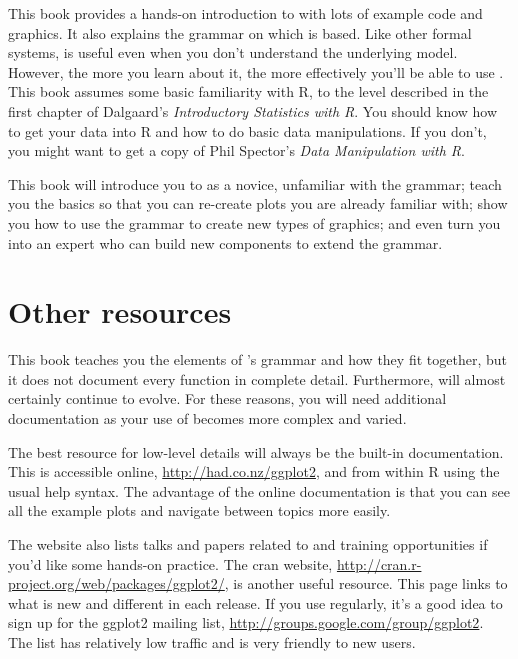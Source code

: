 This book provides a hands-on introduction to \ggplot with lots of example code and graphics. It also explains the grammar on which \ggplot is based. Like other formal systems, \ggplot is useful even when you don't understand the underlying model. However, the more you learn about it, the more effectively you'll be able to use \ggplot.  This book assumes some basic familiarity with R, to the level described in the first chapter of Dalgaard’s \emph{Introductory Statistics with R}. You should know how to get your data into R and how to do basic data manipulations.  If you don't, you might want to get a copy of Phil Spector's \emph{Data Manipulation with R}.  

This book will introduce you to \ggplot as a novice, unfamiliar with the grammar; teach you the basics so that you can re-create plots you are already familiar with; show you how to use the grammar to create new types of graphics; and even turn you into an expert who can build new components to extend the grammar.

\section{Other resources}
\label{sec:other_resources}

This book teaches you the elements of \ggplot's grammar and how they fit together, but it does not document every function in complete detail.  Furthermore, \ggplot will almost certainly continue to evolve.  For these reasons, you will need additional documentation as your use of \ggplot becomes more complex and varied.

The best resource for low-level details will always be the built-in documentation. This is accessible online, \url{http://had.co.nz/ggplot2}, and from within R using the usual help syntax. The advantage of the online documentation is that you can see all the example plots and navigate between topics more easily. 

The website also lists talks and papers related to \ggplot and training opportunities if you'd like some hands-on practice. The {\sc cran} website, \url{http://cran.r-project.org/web/packages/ggplot2/}, is another useful resource. This page links to what is new and different in each release.  If you use \ggplot regularly, it's a good idea to sign up for the ggplot2 mailing list, \url{http://groups.google.com/group/ggplot2}.  The list has relatively low traffic and is very friendly to new users. 

